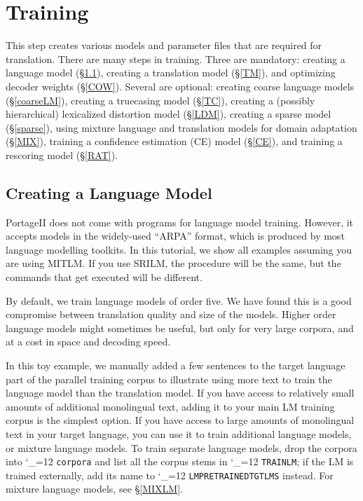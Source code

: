 \documentclass[11pt,letterpaper]{article}
\newcommand{\PS}{PortageII\xspace}
\def\code{\begingroup\catcode`\_=12 \codex}
\newcommand{\codex}[1]{\texttt{#1}\endgroup}
\begin{document}
\section{Training} \label{Training}

This step creates various models and parameter files that are required for
translation. There are many steps in training.  Three are mandatory: creating a
language model (\S\ref{LM}), creating a translation model (\S\ref{TM}), and
optimizing decoder weights (\S\ref{COW}).  Several are optional: creating coarse
language models (\S\ref{coarseLM}), creating a truecasing model (\S\ref{TC}),
creating a (possibly hierarchical) lexicalized distortion model (\S\ref{LDM}),
creating a sparse model (\S\ref{sparse}), using mixture language and
translation models for domain adaptation (\S\ref{MIX}), training a confidence 
estimation (CE) model (\S\ref{CE}), and training a rescoring model
(\S\ref{RAT}).

\subsection{Creating a Language Model} \label{LM}

\PS does not come with programs for language model training. However, it
accepts models in the widely-used ``ARPA'' format, which is produced by most
language modelling toolkits. In this tutorial, we show all examples assuming
you are using MITLM. If you use SRILM, the procedure will be the same, but the
commands that get executed will be different.

By default, we train language models of order five.  We have found this is a
good compromise between translation quality and size of the models.  Higher
order language models might sometimes be useful, but only for very large
corpora, and at a cost in space and decoding speed.

In this toy example, we manually added a few sentences to the target language
part of the parallel training corpus to illustrate using more text to train the
language model than the translation model.  If you have access to relatively
small amounts of additional monolingual text, adding it to your main LM
training corpus is the simplest option.  If you have access to large amounts of
monolingual text in your target language, you can use it to train additional
language models, or mixture language models.  To train separate language
models, drop the corpora into \code{corpora} and list all the corpus stems in
\code{TRAIN\us{}LM}; if the LM is trained externally, add its name to
\code{LM\us{}PRETRAINED\us{}TGT\us{}LMS} instead.  For mixture language models,
see \S\ref{MIXLM}.
\end{document}
